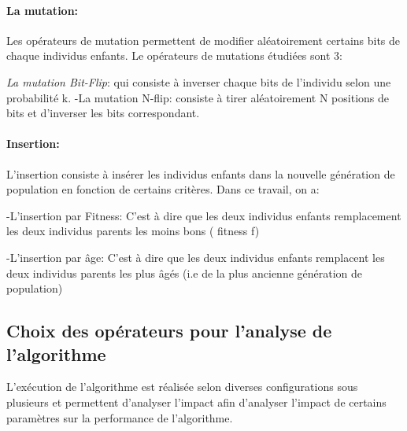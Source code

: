 \documentclass{article}
\begin{document}
\paragraph{ La mutation:}
Les opérateurs de mutation permettent de modifier aléatoirement certains bits de chaque individus enfants. Le opérateurs de mutations étudiées sont 3:

\emph{La mutation Bit-Flip}: qui consiste à inverser chaque bits de l'individu selon une probabilité k.
-La mutation N-flip: consiste à tirer aléatoirement N positions de bits et d'inverser les bits correspondant.

\paragraph{Insertion:}
L'insertion consiste à insérer les individus enfants dans la nouvelle génération de population en fonction de certains critères. Dans ce travail, on a:

-L'insertion par Fitness: C'est à dire que les deux individus enfants remplacement les deux individus parents les moins bons ( fitness f)

-L'insertion par âge: C'est à dire que les deux individus enfants remplacent les deux individus parents les plus âgés (i.e de la plus ancienne génération de population)

\subsection{Choix des opérateurs pour l'analyse de l'algorithme}
L'exécution de l'algorithme est réalisée selon diverses configurations sous plusieurs et permettent d'analyser l'impact afin d'analyser l'impact de certains paramètres sur la performance de l'algorithme.
\end{document}
